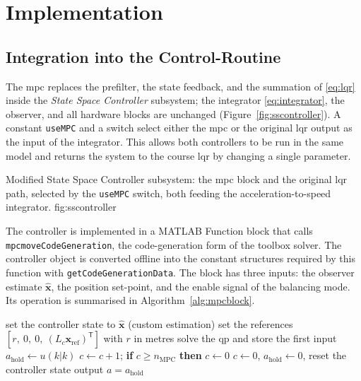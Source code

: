 \section{Implementation}
\label{sec:implementation}

\subsection{Integration into the Control-Routine}
\label{subsec:integration}

The \ac{mpc} replaces the prefilter, the state feedback, and the summation of
\eqref{eq:lqr} inside the \emph{State Space Controller} subsystem; the
integrator \eqref{eq:integrator}, the observer, and all hardware blocks are
unchanged (Figure~\ref{fig:sscontroller}). A constant \texttt{useMPC} and a
switch select either the \ac{mpc} or the original \ac{lqr} output as the
input of the integrator. This allows both controllers to be run in the same
model and returns the system to the course \ac{lqr} by changing a single
parameter.

  {Modified State Space Controller subsystem: the \acs{mpc} block and the original \acs{lqr} path, selected by the \texttt{useMPC} switch, both feeding the acceleration-to-speed integrator.}
  {fig:sscontroller}

\begin{sloppypar}
The controller is implemented in a MATLAB Function block that calls
\texttt{mpcmoveCodeGeneration}, the code-generation form of the toolbox solver.
The controller object is converted offline into the constant structures
required by this function with \texttt{getCodeGenerationData}. The block has
three inputs: the observer estimate $\hat{\mathbf{x}}$, the position
set-point, and the enable signal of the balancing mode. Its operation is
summarised in Algorithm~\ref{alg:mpcblock}.
\end{sloppypar}

\begin{algorithm}[ht]
\caption{Execution of the \acs{mpc} block in each call of the Control-Routine.}
\label{alg:mpcblock}
\begin{algorithmic}[1]
    \STATE set the controller state to $\hat{\mathbf{x}}$ (custom estimation)
    \STATE set the references $[r,\ 0,\ 0,\ (L_c\mathbf{x}_{\mathrm{ref}})^{\mathsf{T}}]$ with $r$ in metres
    \STATE solve the \ac{qp} and store the first input $a_{\mathrm{hold}} \leftarrow u(k|k)$
  \ENDIF
  \STATE $c \leftarrow c + 1$; \textbf{if} $c \ge n_{\mathrm{MPC}}$ \textbf{then} $c \leftarrow 0$
\ELSE
  \STATE $c \leftarrow 0$, $a_{\mathrm{hold}} \leftarrow 0$, reset the controller state
\ENDIF
\STATE output $a = a_{\mathrm{hold}}$
\end{algorithmic}
\end{algorithm}

